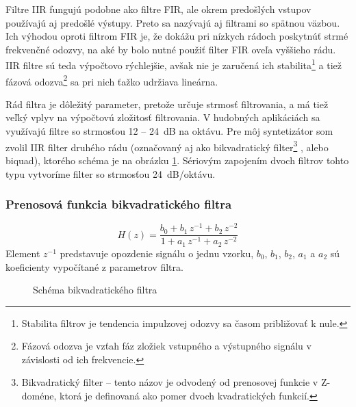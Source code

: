 Filtre IIR fungujú podobne ako filtre FIR, ale okrem predošlých vstupov používajú aj predošlé výstupy. Preto sa nazývajú aj filtrami so spätnou väzbou. Ich výhodou oproti filtrom FIR je, že dokážu pri nízkych rádoch poskytnúť strmé frekvenčné odozvy, na aké by bolo nutné použiť filter FIR oveľa vyššieho rádu. IIR filtre sú teda výpočtovo rýchlejšie, avšak nie je zaručená ich stabilita\footnote{Stabilita filtrov je tendencia impulzovej odozvy sa časom približovať k nule.} a tiež fázová odozva\footnote{Fázová odozva je vzťah fáz zložiek vstupného a výstupného signálu v závislosti od ich frekvencie.} sa pri nich ťažko udržiava lineárna.

Rád filtra je dôležitý parameter, pretože určuje strmosť filtrovania, a má tiež veľký vplyv na výpočtovú zložitosť filtrovania. V hudobných aplikáciách sa využívajú filtre so strmosťou 12 -- 24~dB na oktávu. Pre môj syntetizátor som zvolil IIR filter druhého rádu (označovaný aj ako \bq bikvadratický filter\eq \footnote{Bikvadratický filter -- tento názov je odvodený od prenosovej funkcie v Z-doméne, ktorá je definovaná ako pomer dvoch kvadratických funkcií.} , alebo \bq biquad\eq), ktorého schéma je na obrázku \ref{obr09}. Sériovým zapojením dvoch filtrov tohto typu vytvoríme filter so strmosťou 24~dB/oktávu.

\subsubsection*{Prenosová funkcia bikvadratického filtra}

\begin{equation*}
H(z) = \frac{b_0 + b_1\,z^{-1} + b_2\,z^{-2}}{1 + a_1\,z^{-1} + a_2\,z^{-2}}
\end{equation*}
Element $z^{-1}$ predstavuje opozdenie signálu o jednu vzorku, $b_0$, $b_1$, $b_2$, $a_1$ a $a_2$ sú koeficienty vypočítané z parametrov filtra.

\begin{figure}[h]
\centering
{}
\caption{\label{obr09} Schéma bikvadratického filtra}
\end{figure}

